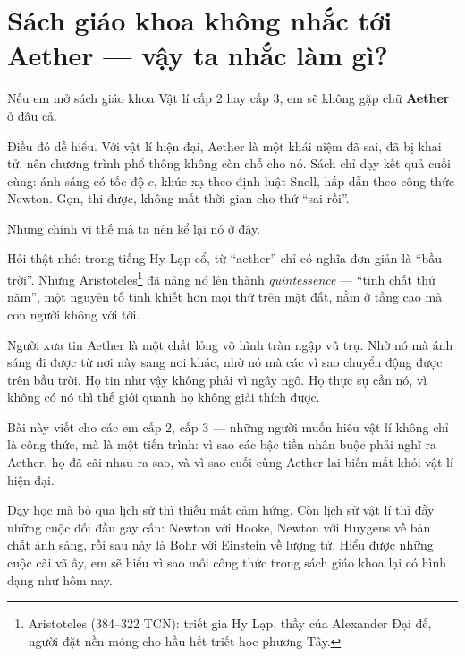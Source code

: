 
\section{Sách giáo khoa không nhắc tới Aether — vậy ta nhắc làm gì?}

Nếu em mở sách giáo khoa Vật lí cấp 2 hay cấp 3, em sẽ không gặp chữ \textbf{Aether} ở đâu cả.

Điều đó dễ hiểu. Với vật lí hiện đại, Aether là một khái niệm đã sai, đã bị khai tử, nên chương trình phổ thông không còn chỗ cho nó. Sách chỉ dạy kết quả cuối cùng: ánh sáng có tốc độ $c$, khúc xạ theo định luật Snell, hấp dẫn theo công thức Newton. Gọn, thi được, không mất thời gian cho thứ ``sai rồi''.

Nhưng chính vì thế mà ta nên kể lại nó ở đây.

Hỏi thật nhé: trong tiếng Hy Lạp cổ, từ “aether” chỉ có nghĩa đơn giản là “bầu trời”. Nhưng Aristoteles\footnote{Aristoteles (384--322 TCN): triết gia Hy Lạp, thầy của Alexander Đại đế, người đặt nền móng cho hầu hết triết học phương Tây.} đã nâng nó lên thành \emph{quintessence} — “tinh chất thứ năm”, một nguyên tố tinh khiết hơn mọi thứ trên mặt đất, nằm ở tầng cao mà con người không với tới.

Người xưa tin Aether là một chất lỏng vô hình tràn ngập vũ trụ. Nhờ nó mà ánh sáng đi được từ nơi này sang nơi khác, nhờ nó mà các vì sao chuyển động được trên bầu trời. Họ tin như vậy không phải vì ngây ngô. Họ thực sự cần nó, vì không có nó thì thế giới quanh họ không giải thích được.

Bài này viết cho các em cấp 2, cấp 3 — những người muốn hiểu vật lí không chỉ là công thức, mà là một tiến trình: vì sao các bậc tiền nhân buộc phải nghĩ ra Aether, họ đã cãi nhau ra sao, và vì sao cuối cùng Aether lại biến mất khỏi vật lí hiện đại.

Dạy học mà bỏ qua lịch sử thì thiếu mất cảm hứng. Còn lịch sử vật lí thì đầy những cuộc đối đầu gay cấn: Newton với Hooke, Newton với Huygens về bản chất ánh sáng, rồi sau này là Bohr với Einstein về lượng tử. Hiểu được những cuộc cãi vã ấy, em sẽ hiểu vì sao mỗi công thức trong sách giáo khoa lại có hình dạng như hôm nay.

